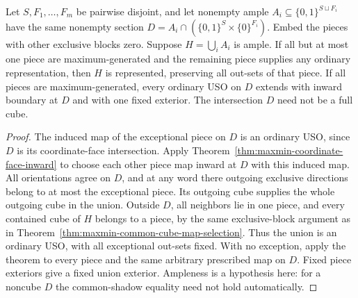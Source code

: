 \begin{corollary}
\label{cor:maxmin-noncube-face-gluing}
Let $S,F_1,\ldots,F_m$ be pairwise disjoint, and let nonempty ample
$A_i\subseteq\{0,1\}^{S\sqcup F_i}$ have the same nonempty section
$D=A_i\cap(\{0,1\}^S\times\{0\}^{F_i})$. Embed the pieces with
other exclusive blocks zero. Suppose $H=\bigcup_iA_i$ is ample.
If all but at most one piece are maximum-generated and the remaining
piece supplies any ordinary representation, then $H$ is represented,
preserving all out-sets of that piece. If all pieces are maximum-generated,
every ordinary USO on $D$ extends with inward boundary at $D$ and
with one fixed exterior. The intersection $D$ need not be a full cube.
\end{corollary}
\begin{proof}
The induced map of the exceptional piece on $D$ is an ordinary USO,
since $D$ is its coordinate-face intersection. Apply
Theorem~\ref{thm:maxmin-coordinate-face-inward} to choose each other
piece map inward at $D$ with this induced map. All orientations agree
on $D$, and at any word there outgoing exclusive directions belong
to at most the exceptional piece. Its outgoing cube supplies the
whole outgoing cube in the union. Outside $D$, all neighbors lie in
one piece, and every contained cube of $H$ belongs to a piece, by
the same exclusive-block argument as in
Theorem~\ref{thm:maxmin-common-cube-map-selection}. Thus the union
is an ordinary USO, with all exceptional out-sets fixed.
With no exception, apply the theorem to every piece and the same
arbitrary prescribed map on $D$. Fixed piece exteriors give a fixed
union exterior. Ampleness is a hypothesis here: for a noncube $D$
the common-shadow equality need not hold automatically.
\end{proof}

